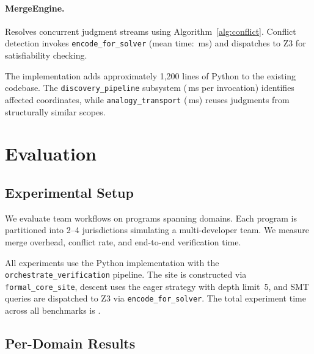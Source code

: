 \documentclass[11pt]{article}
\begin{document}
\paragraph{MergeEngine.}
Resolves concurrent judgment streams using Algorithm~\ref{alg:conflict}.
Conflict detection invokes \texttt{encode\_for\_solver} (mean time:
\compProfEncodeForSolverMeanMs{}\,ms) and dispatches to Z3 for satisfiability
checking.

The implementation adds approximately 1{,}200 lines of Python to the existing
codebase. The \texttt{discovery\_pipeline} subsystem
(\compProfDiscoveryPipelineMeanMs{}\,ms per invocation) identifies affected
coordinates, while \texttt{analogy\_transport}
(\compProfAnalogyTransportMeanMs{}\,ms) reuses judgments from structurally
similar scopes.

\section{Evaluation}\label{sec:evaluation}

\subsection{Experimental Setup}

We evaluate team workflows on \expTotalPrograms{} programs spanning
\expDomainCount{} domains. Each program is partitioned into 2--4 jurisdictions
simulating a multi-developer team. We measure merge overhead, conflict rate,
and end-to-end verification time.

All experiments use the \JuGeo{} Python implementation with the
\texttt{orchestrate\_verification} pipeline. The site is constructed via
\texttt{formal\_core\_site}, descent uses the eager strategy with depth limit~5,
and SMT queries are dispatched to Z3 via \texttt{encode\_for\_solver}. The
total experiment time across all benchmarks is \subTotalExperimentTime{}.

\subsection{Per-Domain Results}
\end{document}
